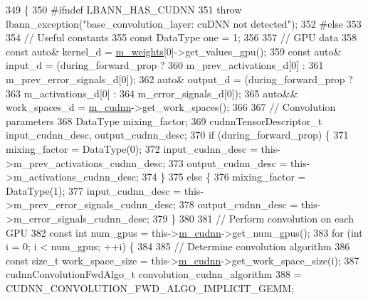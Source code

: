 \begin{DoxyCode}
349                                                          \{
350 \textcolor{preprocessor}{  #ifndef LBANN\_HAS\_CUDNN}
351     \textcolor{keywordflow}{throw} lbann\_exception(\textcolor{stringliteral}{"base\_convolution\_layer: cuDNN not detected"});
352 \textcolor{preprocessor}{  #else}
353 
354     \textcolor{comment}{// Useful constants}
355     \textcolor{keyword}{const} DataType one = 1;
356 
357     \textcolor{comment}{// GPU data}
358     \textcolor{keyword}{const} \textcolor{keyword}{auto}& kernel\_d = \hyperlink{classlbann_1_1Layer_a7954e30fbf9100a6ba4b56d02767a469}{m\_weights}[0]->get\_values\_gpu();
359     \textcolor{keyword}{const} \textcolor{keyword}{auto}& input\_d = (during\_forward\_prop ?
360                            m\_prev\_activations\_d[0] :
361                            m\_prev\_error\_signals\_d[0]);
362     \textcolor{keyword}{auto}& output\_d = (during\_forward\_prop ?
363                       m\_activations\_d[0] :
364                       m\_error\_signals\_d[0]);
365     \textcolor{keyword}{auto}&& work\_spaces\_d = \hyperlink{classlbann_1_1Layer_a08dbb94239e3b8c96329786c57c72e21}{m\_cudnn}->get\_work\_spaces();
366 
367     \textcolor{comment}{// Convolution parameters}
368     DataType mixing\_factor;
369     cudnnTensorDescriptor\_t input\_cudnn\_desc, output\_cudnn\_desc;
370     \textcolor{keywordflow}{if} (during\_forward\_prop) \{
371       mixing\_factor = DataType(0);
372       input\_cudnn\_desc = this->m\_prev\_activations\_cudnn\_desc;
373       output\_cudnn\_desc = this->m\_activations\_cudnn\_desc;
374     \}
375     \textcolor{keywordflow}{else} \{
376       mixing\_factor = DataType(1);
377       input\_cudnn\_desc = this->m\_prev\_error\_signals\_cudnn\_desc;
378       output\_cudnn\_desc = this->m\_error\_signals\_cudnn\_desc;
379     \}
380 
381     \textcolor{comment}{// Perform convolution on each GPU}
382     \textcolor{keyword}{const} \textcolor{keywordtype}{int} num\_gpus = this->\hyperlink{classlbann_1_1Layer_a08dbb94239e3b8c96329786c57c72e21}{m\_cudnn}->get\_num\_gpus();
383     \textcolor{keywordflow}{for} (\textcolor{keywordtype}{int} i = 0; i < num\_gpus; ++i) \{
384 
385       \textcolor{comment}{// Determine convolution algorithm}
386       \textcolor{keyword}{const} \textcolor{keywordtype}{size\_t} work\_space\_size = this->\hyperlink{classlbann_1_1Layer_a08dbb94239e3b8c96329786c57c72e21}{m\_cudnn}->get\_work\_space\_size(i);
387       cudnnConvolutionFwdAlgo\_t convolution\_cudnn\_algorithm
388         = CUDNN\_CONVOLUTION\_FWD\_ALGO\_IMPLICIT\_GEMM;

\end{DoxyCode}
